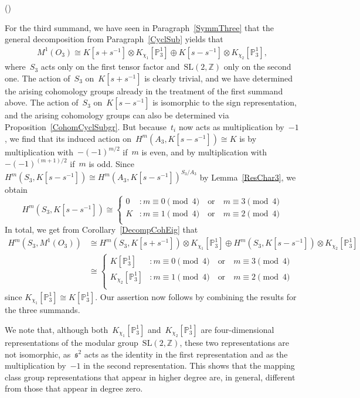 \documentclass[12pt]{article}
\makeatletter
\newcounter{num}
\newenvironment{pflist}{\begin{list}{(\arabic{num})}{\usecounter{num} \leftmargin0cm \itemindent5pt}}{\end{list}}
\theoremstyle{definition}
\theoremstyle{break}
\renewenvironment{proof}[1][\proofname]{\par
\vspace{-5pt}%
\pushQED{\qed}%
\normalfont
\topsep0pt \partopsep0pt %
\trivlist
\item[\hskip\labelsep
\bfseries
#1\@addpunct{.}]\ignorespaces
}{%
\popQED\endtrivlist\@endpefalse
\addvspace{6pt plus 6pt} %
}
\newcommand{\Z}{\mathbb{Z}}
\newcommand{\SL}{\mathrm{SL}}
\newcommand{\fs}{\mathfrak{s}}
\renewcommand{\P}{\mathbb{P}}
\renewcommand{\1}{\mathbbm{1}}
\renewcommand{\P}{\mathbb{P}}
\newcommand{\ot}{\mathbin{\otimes}}
\makeatother
\begin{document}
\begin{proof}
\begin{pflist}
\item
For the third summand, we have seen in Paragraph~\ref{SymmThree} that the general decomposition from Paragraph~\ref{CyclSub} yields that
\begin{align*}
M^1(O_3)
\cong K[s + s^{-1}] \ot K_{\chi_1}[\P_3^{1}]
\oplus K[s - s^{-1}] \ot K_{\chi_2}[\P_3^{1}],
\end{align*}
where~$S_3$ acts only on the first tensor factor and~$\SL(2, \Z)$ only on the second one. The action of~$S_3$ on~$K[s + s^{-1}]$ is clearly trivial, and we have determined the arising cohomology groups already in the treatment of the first summand above. The action of~$S_3$ on~$K[s - s^{-1}]$ is isomorphic to the sign representation, and the arising cohomology groups can also be determined via Proposition~\ref{CohomCyclSubgr}. But because~$t_i$ now acts as multiplication by~$-1$, we find that its induced action on~$H^m(A_3, K[s - s^{-1}]) \cong K$ is by multiplication with~$-(-1)^{m/2}$ if~$m$ is even, and by multiplication with~$-(-1)^{(m+1)/2}$ if~$m$ is odd. Since
$H^m(S_3, K[s - s^{-1}]) \cong H^m(A_3, K[s - s^{-1}])^{S_3/A_3}$ by Lemma~\ref{ResChar3}, we obtain
\[H^m(S_3, K[s - s^{-1}]) \cong
\begin{cases}
0 &: m \equiv 0 \pmod{4} \quad \text{or} \quad m \equiv 3 \pmod{4}\\
K &: m \equiv 1 \pmod{4}  \quad \text{or} \quad m \equiv 2 \pmod{4}\\
\end{cases}\]
In total, we get from Corollary~\ref{DecompCohEig} that
\begin{align*}
H^m(S_3, M^1(O_3))
&\cong H^m(S_3, K[s + s^{-1}]) \ot K_{\chi_1}[\P_3^{1}] \oplus
H^m(S_3, K[s - s^{-1}]) \ot K_{\chi_2}[\P_3^{1}] \\
&\cong
\begin{cases}
K[\P_3^{1}] &: m \equiv 0 \pmod{4} \quad \text{or} \quad m \equiv 3 \pmod{4}\\
K_{\chi_2}[\P_3^{1}] &: m \equiv 1 \pmod{4}  \quad \text{or} \quad m \equiv 2 \pmod{4}\\
\end{cases}
\end{align*}
since $K_{\chi_1}[\P_3^{1}] \cong K[\P_3^{1}]$. Our assertion now follows by combining the results for the three summands.
\qedhere
\end{pflist}
\end{proof}

We note that, although both~$K_{\chi_1}[\P_3^{1}]$ and~$K_{\chi_2}[\P_3^{1}]$ are four-dimensional representations of the modular group~$\SL(2, \Z)$, these two representations are not isomorphic, as~$\fs^2$ acts as the identity in the first representation and as the multiplication by~$-1$ in the second representation. This shows that the mapping class group representations that appear in higher degree are, in general, different from those that appear in degree zero.
\end{document}
